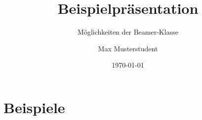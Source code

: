 

\title{Beispielpräsentation}
\subtitle{Möglichkeiten der Beamer-Klasse}
\author{Max Musterstudent}
\date{\today}



	\part{Beispiele}
	


